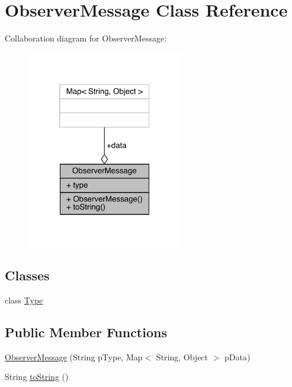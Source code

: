\hypertarget{classcom_1_1toast_1_1android_1_1gamebase_1_1observer_1_1_observer_message}{}\section{Observer\+Message Class Reference}
\label{classcom_1_1toast_1_1android_1_1gamebase_1_1observer_1_1_observer_message}


Collaboration diagram for Observer\+Message\+:
\nopagebreak
\begin{figure}[H]
\begin{center}
\leavevmode
\includegraphics[width=193pt]{classcom_1_1toast_1_1android_1_1gamebase_1_1observer_1_1_observer_message__coll__graph}
\end{center}
\end{figure}
\subsection*{Classes}
\begin{DoxyCompactItemize}
\item 
class \hyperlink{classcom_1_1toast_1_1android_1_1gamebase_1_1observer_1_1_observer_message_1_1_type}{Type}
\end{DoxyCompactItemize}
\subsection*{Public Member Functions}
\begin{DoxyCompactItemize}
\item 
\hyperlink{classcom_1_1toast_1_1android_1_1gamebase_1_1observer_1_1_observer_message_a0d17c55fa642e66ccb819f5aa479bcf0}{Observer\+Message} (String p\+Type, Map$<$ String, Object $>$ p\+Data)
\item 
String \hyperlink{classcom_1_1toast_1_1android_1_1gamebase_1_1observer_1_1_observer_message_ad146fa8579a5f8a876c4688cc5a68520}{to\+String} ()
\end{DoxyCompactItemize}
